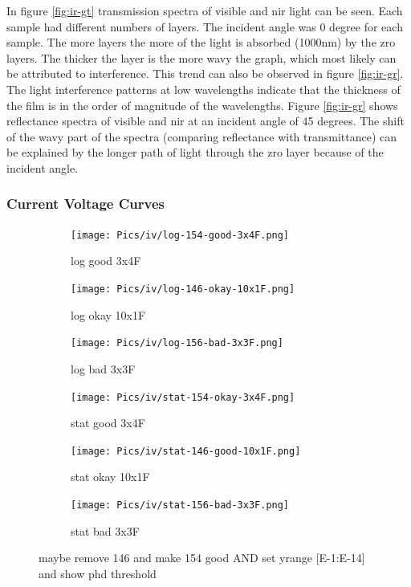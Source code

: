 In figure \ref{fig:ir-gt} transmission spectra of visible and \gls{nir} light can be seen. 
Each sample had different numbers of layers. 
The incident angle was 0 degree for each sample.
The more layers the more of the light is absorbed (1000nm) by the \gls{zro} layers. 
The thicker the layer is the more wavy the graph, which most likely can be attributed to interference.
This trend can also be observed in figure \ref{fig:ir-gr}.
The light interference patterns at low wavelengths indicate that the thickness of the film is in the order of magnitude of the wavelengths\cite{delimafilho2017film}. 
Figure \ref{fig:ir-gr} shows reflectance spectra of visible and \gls{nir} at an incident angle of 45 degrees. 
The shift of the wavy part of the spectra (comparing reflectance with transmittance) 
can be explained by the longer path of light through the \gls{zro} layer because of the incident angle. 

\subsubsection{Current Voltage Curves} 
\begin{figure}
    \centering
    \begin{subfigure}{.3\textwidth}
        \texttt{[image: Pics/iv/log-154-good-3x4F.png]}
        \caption{log good 3x4F} \label{fig:iv-log-good}
    \end{subfigure}
    \begin{subfigure}{.3\textwidth}
        \texttt{[image: Pics/iv/log-146-okay-10x1F.png]}
        \caption{log okay 10x1F} \label{fig:iv-log-okay}
    \end{subfigure}
    \begin{subfigure}{.3\textwidth}
        \texttt{[image: Pics/iv/log-156-bad-3x3F.png]}
        \caption{log bad 3x3F} \label{fig:iv-log-bad}
    \end{subfigure}
    \begin{subfigure}{.3\textwidth}
        \texttt{[image: Pics/iv/stat-154-okay-3x4F.png]}
        \caption{stat good 3x4F} \label{fig:iv-stat-good}
    \end{subfigure}
    \begin{subfigure}{.3\textwidth}
        \texttt{[image: Pics/iv/stat-146-good-10x1F.png]}
        \caption{stat okay 10x1F} \label{fig:iv-stat-okay}
    \end{subfigure}
    \begin{subfigure}{.3\textwidth}
        \texttt{[image: Pics/iv/stat-156-bad-3x3F.png]}
        \caption{stat bad 3x3F} \label{fig:iv-stat-bad}
    \end{subfigure}
    \caption{maybe remove 146 and make 154 good AND set yrange [E-1:E-14] and show phd threshold} \label{fig:iv}
\end{figure}

